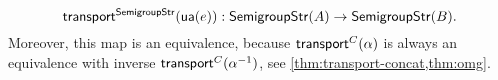 \documentclass[hott-all.tex]{subfiles}
\begin{document}
\[
\mathsf{transport}^{\mathsf{SemigroupStr}}{(\mathsf{ua}(e))} : \mathsf{SemigroupStr}(A) \to \mathsf{SemigroupStr}(B).
\]
Moreover, this map is an equivalence, because
$\mathsf{transport}^{C}(\alpha)$ is always an equivalence with inverse
$\mathsf{transport}^{C}{(\mathord{{\alpha}^{-1}})}$, see \cref{thm:transport-concat,thm:omg}.
\end{document}
